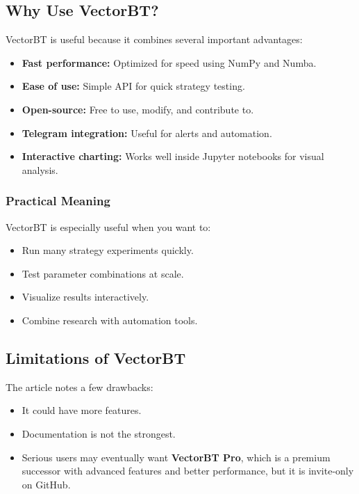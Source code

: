 \documentclass[12pt,openany]{book}
\begin{document}
\subsection{Why Use VectorBT?}

VectorBT is useful because it combines several important advantages:

\begin{itemize}[leftmargin=*]
    \item \textbf{Fast performance:} Optimized for speed using NumPy and Numba.
    \item \textbf{Ease of use:} Simple API for quick strategy testing.
    \item \textbf{Open-source:} Free to use, modify, and contribute to.
    \item \textbf{Telegram integration:} Useful for alerts and automation.
    \item \textbf{Interactive charting:} Works well inside Jupyter notebooks for visual analysis.
\end{itemize}

\subsubsection{Practical Meaning}

VectorBT is especially useful when you want to:

\begin{itemize}[leftmargin=*]
    \item Run many strategy experiments quickly.
    \item Test parameter combinations at scale.
    \item Visualize results interactively.
    \item Combine research with automation tools.
\end{itemize}

\subsection{Limitations of VectorBT}

The article notes a few drawbacks:

\begin{itemize}[leftmargin=*]
    \item It could have more features.
    \item Documentation is not the strongest.
    \item Serious users may eventually want \textbf{VectorBT Pro}, which is a premium successor with advanced features and better performance, but it is invite-only on GitHub.
\end{itemize}
\end{document}
